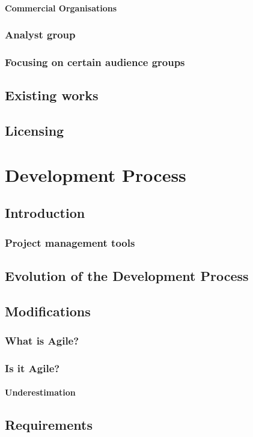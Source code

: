 \subsubsection{Commercial Organisations}
\subsection{Analyst group}
\subsection{Focusing on certain audience groups}
\section{Existing works}
\section{Licensing}
\chapter{Development Process}
\section{Introduction}
\subsection{Project management tools}
\section{Evolution of the Development Process}
\section{Modifications}
\subsection{What is Agile?}
\subsection{Is it Agile?}
\subsubsection{Underestimation}
\section{Requirements}
